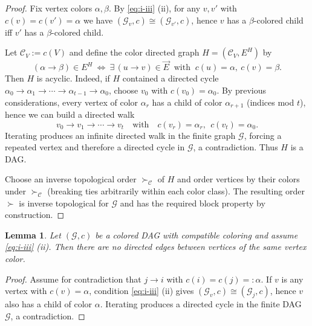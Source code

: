 \documentclass[12pt]{amsart}
\theoremstyle{plain}
\newtheorem{lemma}[theorem]{Lemma}
\theoremstyle{definition}
\theoremstyle{remark}
\newcommand{\1}{\mathbf{1}}
\begin{document}
\begin{proof}
Fix vertex colors $\alpha,\beta$.
By \eqref{eq:i-iii} (ii), for any $v,v'$ with $c(v)=c(v')=\alpha$ we have $(\mathcal{G}_v,c)\cong(\mathcal{G}_{v'},c)$,
hence $v$ has a $\beta$-colored child iff $v'$ has a $\beta$-colored child.

Let $\mathcal{C}_V:=c(V)$ and define the color directed graph $H=(\mathcal{C}_V,E^H)$ by
\[
(\alpha\to\beta)\in E^H
\ \Longleftrightarrow\
\exists\, (u\to v)\in \vec{E} \ \text{ with }\ c(u)=\alpha,\ c(v)=\beta.
\]
Then $H$ is acyclic. Indeed, if $H$ contained a directed cycle
$\alpha_0\to\alpha_1\to\cdots\to\alpha_{t-1}\to\alpha_0$, choose $v_0$ with $c(v_0)=\alpha_0$. By previous considerations,  every vertex of color $\alpha_r$ has a child of color
$\alpha_{r+1}$ (indices mod $t$), hence we can build a directed walk
\[
v_0\to v_1\to\cdots\to v_t \quad\text{with}\quad c(v_r)=\alpha_r,\ \ c(v_t)=\alpha_0.
\]
Iterating produces an infinite directed walk in the finite graph $\mathcal{G}$, forcing a repeated vertex and
therefore a directed cycle in $\mathcal{G}$, a contradiction. Thus $H$ is a DAG.

Choose an inverse topological order $\succ_{\mathcal{C}}$ of $H$ and order vertices by their colors under $\succ_{\mathcal{C}}$
(breaking ties arbitrarily within each color class). The resulting order $\succ$ is inverse topological for $\mathcal{G}$ and
has the required block property by construction.
\end{proof}

\begin{lemma}\label{lem:no-same-colour-edges}
Let $(\mathcal{G},c)$ be a colored DAG with compatible coloring and assume \eqref{eq:i-iii} (ii).
Then there are no directed edges between vertices of the same vertex color.
\end{lemma}

\begin{proof}
Assume for contradiction that $j\to i$ with $c(i)=c(j)=:\alpha$. 
If $v$ is any vertex with $c(v)=\alpha$, condition \eqref{eq:i-iii} (ii) gives $(\mathcal{G}_v,c)\cong(\mathcal{G}_j,c)$,
hence $v$ also has a child of color $\alpha$. Iterating produces a directed cycle in the finite DAG $\mathcal{G}$, a contradiction.
\end{proof}
\end{document}
